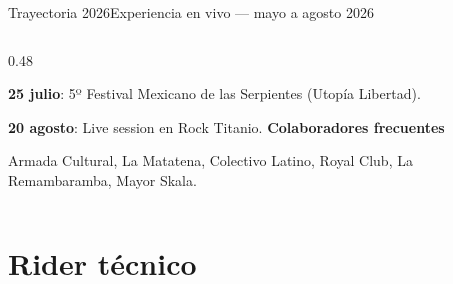 \documentclass[11pt,notheorems,hyperref={pdfauthor={Séptima Ola}}]{beamer}
\let\olditemize\itemize
\let\oldenditemize\enditemize
\renewenvironment{itemize}
  {\vspace{-3pt}\olditemize\setlength{\itemsep}{1pt}\setlength{\parskip}{0pt}\setlength{\parsep}{0pt}}
  {\oldenditemize\vspace{-3pt}}
\begin{document}
{\begin{frame}[plain]{Trayectoria 2026}{Experiencia en vivo — mayo a agosto 2026}
\begin{columns}[T,totalwidth=\textwidth]
\begin{column}{0.48\textwidth}
\begin{itemize}
      \item \textbf{25 julio}: 5º Festival Mexicano de las Serpientes (Utopía Libertad).
      \item \textbf{20 agosto}: Live session en Rock Titanio.
    \end{itemize}
    \vspace{2pt}
    \textbf{Colaboradores frecuentes}
    \begin{itemize}
      \item Armada Cultural, La Matatena, Colectivo Latino, Royal Club, La Remambaramba, Mayor Skala.
    \end{itemize}
  \end{column}
\end{columns}
\end{frame}}

\section{Rider técnico}
\end{document}
